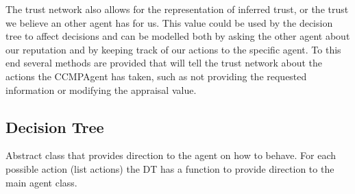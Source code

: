 The trust network also allows for the representation of inferred trust, or the
trust we believe an other agent has for us.  This value could be used by the
decision tree to affect decisions and can be modelled both by asking the other
agent about our reputation and by keeping track of our actions to the specific
agent.  To this end several methods are provided that will tell the trust
network about the actions the CCMPAgent has taken, such as not providing the
requested information or modifying the appraisal value.

\subsection{Decision Tree}
Abstract class that provides direction to the agent on how to behave.  For each
possible action (list actions) the DT has a function to provide direction to
the main agent class.
